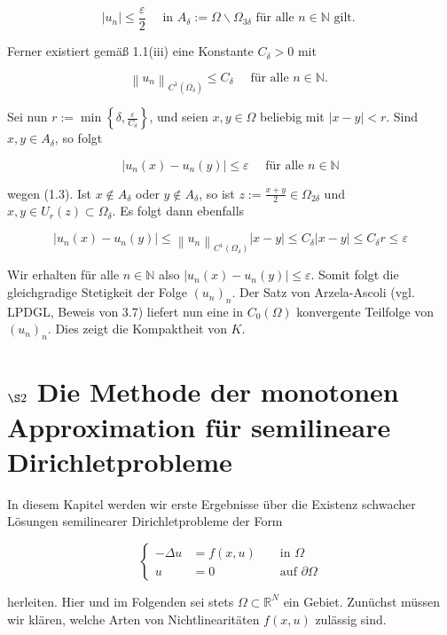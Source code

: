 \documentclass[10pt, letterpaper]{article}
\begin{document}
$$
\left|u_{n}\right| \leq \frac{\varepsilon}{2} \quad \text { in } A_{\delta}:=\Omega \backslash \Omega_{3 \delta} \text { für alle } n \in \mathbb{N} \text { gilt. }
$$

Ferner existiert gemäß 1.1(iii) eine Konstante $C_{\delta}>0$ mit

$$
\left\|u_{n}\right\|_{C^{1}\left(\overline{\Omega_{\delta}}\right)} \leq C_{\delta} \quad \text { für alle } n \in \mathbb{N} \text {. }
$$

Sei nun $r:=\min \left\{\delta, \frac{\varepsilon}{C_{\delta}}\right\}$, und seien $x, y \in \Omega$ beliebig mit $|x-y|<r$. Sind $x, y \in A_{\delta}$, so folgt

$$
\left|u_{n}(x)-u_{n}(y)\right| \leq \varepsilon \quad \text { für alle } n \in \mathbb{N}
$$

wegen (1.3). Ist $x \notin A_{\delta}$ oder $y \notin A_{\delta}$, so ist $z:=\frac{x+y}{2} \in \Omega_{2 \delta}$ und $x, y \in U_{r}(z) \subset \Omega_{\delta}$. Es folgt dann ebenfalls

$$
\left|u_{n}(x)-u_{n}(y)\right| \leq\left\|u_{n}\right\|_{C^{1}\left(\Omega_{\delta}\right)}|x-y| \leq C_{\delta}|x-y| \leq C_{\delta} r \leq \varepsilon
$$

Wir erhalten für alle $n \in \mathbb{N}$ also $\left|u_{n}(x)-u_{n}(y)\right| \leq \varepsilon$. Somit folgt die gleichgradige Stetigkeit der Folge $\left(u_{n}\right)_{n}$. Der Satz von Arzela-Ascoli (vgl. LPDGL, Beweis von 3.7) liefert nun eine in $C_{0}(\Omega)$ konvergente Teilfolge von $\left(u_{n}\right)_{n}$. Dies zeigt die Kompaktheit von $K$.



\section*{$\S 2$ Die Methode der monotonen Approximation für semilineare Dirichletprobleme}

In diesem Kapitel werden wir erste Ergebnisse über die Existenz schwacher Lösungen semilinearer Dirichletprobleme der Form

$$
\left\{\begin{aligned}
-\Delta u & =f(x, u) & & \text { in } \Omega \\
u & =0 & & \text { auf } \partial \Omega
\end{aligned}\right.
$$

herleiten. Hier und im Folgenden sei stets $\Omega \subset \mathbb{R}^{N}$ ein Gebiet. Zunüchst müssen wir klären, welche Arten von Nichtlinearitäten $f(x, u)$ zulässig sind.
\end{document}
